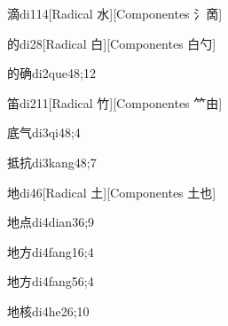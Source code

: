\begin{verbete}{滴}{di1}{14}[Radical 水][Componentes ⺡啇]
\end{verbete}

\begin{verbete}{的}{di2}{8}[Radical 白][Componentes 白勺]
\end{verbete}

\begin{verbete}{的确}{di2que4}{8;12}
\end{verbete}

\begin{verbete}{笛}{di2}{11}[Radical 竹][Componentes ⺮由]
\end{verbete}

\begin{verbete}{底气}{di3qi4}{8;4}
\end{verbete}

\begin{verbete}{抵抗}{di3kang4}{8;7}
\end{verbete}

\begin{verbete}{地}{di4}{6}[Radical 土][Componentes 土也]
\end{verbete}

\begin{verbete}{地点}{di4dian3}{6;9}
\end{verbete}

\begin{verbete}{地方}{di4fang1}{6;4}
\end{verbete}

\begin{verbete}{地方}{di4fang5}{6;4}
\end{verbete}

\begin{verbete}{地核}{di4he2}{6;10}
\end{verbete}

